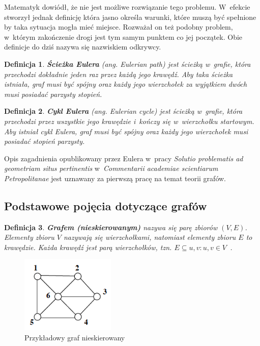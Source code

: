 \documentclass[twoside,12pt]{report}
\newtheorem{definition}{Definicja} %
\begin{document}
Matematyk dowiódł, że nie jest możliwe rozwiązanie tego problemu. W~efekcie stworzył jednak definicję która jasno określa warunki, które muszą być spełnione by taka sytuacja mogła mieć miejsce. Rozważał on też podobny problem, w~którym zakończenie drogi jest tym samym punktem co jej początek. Obie definicje do dziś nazywa się nazwiskiem odkrywcy.

\begin{definition}
\textbf{Ścieżka Eulera} \textit{(ang. Eulerian path)} jest ścieżką w~grafie, która przechodzi dokładnie jeden raz przez każdą jego krawędź. Aby taka ścieżka istniała, graf musi być spójny oraz każdy jego wierzchołek za wyjątkiem dwóch musi posiadać parzysty stopień.
\end{definition}

\begin{definition}
\textbf{Cykl Eulera} \textit{(ang. Eulerian cycle)} jest ścieżką w~grafie, która przechodzi przez wszystkie jego krawędzie i~kończy się w~wierzchołku startowym. Aby istniał cykl Eulera, graf musi być spójny oraz każdy jego wierzchołek musi posiadać stopień parzysty.
\end{definition}

Opis zagadnienia opublikowany przez Eulera w~pracy \textit{Solutio problematis ad geometriam situs pertinentis} w~\textit{Commentarii academiae scientiarum Petropolitanae} jest uznawany za pierwszą pracę na temat teorii grafów.

\subsection{Podstawowe pojęcia dotyczące grafów}\label{sec:podstawy_grafy}

\begin{definition}\label{def:graf_nieskierowany}
\textbf{Grafem (nieskierowanym)} nazywa się parę zbiorów $(V,E)$. Elementy zbioru $V$ nazywają się \textit{wierzchołkami}, natomiast elementy zbioru $E$ to \textit{krawędzie}. Każda krawędź jest parą wierzchołków, tzn. $E \subseteq {{u,v}:u,v \in V}$~\cite{grafy}.
\end{definition}

\begin{figure}[htbp]
	\centering
	\includegraphics[width=0.40\textwidth]{img/graf1}
	\caption{Przykładowy graf nieskierowany} 
	\label{fig:graf_nieskierowany}
\end{figure}
\end{document}
